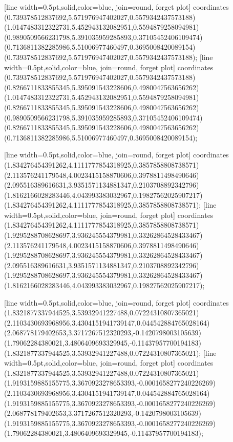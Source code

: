 [line width=0.5pt,solid,color=blue, join=round, forget plot] coordinates {(0.739378512837692,5.571976947402027,0.5579342437573188) (1.0147483312322731,5.452943132082951,0.5594879258094981) (0.9890509566231798,5.391035959285893,0.37105452406109474) (0.7136811382285986,5.51006977460497,0.3695008420089154) (0.739378512837692,5.571976947402027,0.5579342437573188)};
[line width=0.5pt,solid,color=blue, join=round, forget plot] coordinates {(0.739378512837692,5.571976947402027,0.5579342437573188) (0.8266711833855345,5.395091543228606,0.4980047563656262) (1.0147483312322731,5.452943132082951,0.5594879258094981) (0.8266711833855345,5.395091543228606,0.4980047563656262) (0.9890509566231798,5.391035959285893,0.37105452406109474) (0.8266711833855345,5.395091543228606,0.4980047563656262) (0.7136811382285986,5.51006977460497,0.3695008420089154)};

[line width=0.5pt,solid,color=blue, join=round, forget plot] coordinates {(1.834276454391262,4.1111777854318925,0.3857858808738571) (2.113576241179548,4.0023415158870606,0.3978811498490646) (2.095516389616631,3.9351571134881347,0.2103708892342796) (1.8162166028283446,4.043993383032967,0.19827562025907217) (1.834276454391262,4.1111777854318925,0.3857858808738571)};
[line width=0.5pt,solid,color=blue, join=round, forget plot] coordinates {(1.834276454391262,4.1111777854318925,0.3857858808738571) (1.9295288708628697,3.936245554379981,0.33262864528433467) (2.113576241179548,4.0023415158870606,0.3978811498490646) (1.9295288708628697,3.936245554379981,0.33262864528433467) (2.095516389616631,3.9351571134881347,0.2103708892342796) (1.9295288708628697,3.936245554379981,0.33262864528433467) (1.8162166028283446,4.043993383032967,0.19827562025907217)};

[line width=0.5pt,solid,color=blue, join=round, forget plot] coordinates {(1.8321877337944525,3.53932941227488,0.07224310807365021) (2.1103430693968956,3.4304151941739147,0.044542884765028164) (2.068778179402653,3.3717267512320293,-0.1420798003105639) (1.79062284380021,3.4806409693329945,-0.11437957700194183) (1.8321877337944525,3.53932941227488,0.07224310807365021)};
[line width=0.5pt,solid,color=blue, join=round, forget plot] coordinates {(1.8321877337944525,3.53932941227488,0.07224310807365021) (1.9193159885155775,3.3670923278653393,-0.0001658277240226269) (2.1103430693968956,3.4304151941739147,0.044542884765028164) (1.9193159885155775,3.3670923278653393,-0.0001658277240226269) (2.068778179402653,3.3717267512320293,-0.1420798003105639) (1.9193159885155775,3.3670923278653393,-0.0001658277240226269) (1.79062284380021,3.4806409693329945,-0.11437957700194183)};


